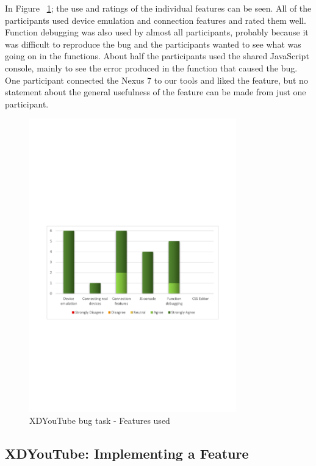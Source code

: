 In Figure ~\ref{fig:xdyt_bug_features_used}; the use and ratings of the individual features can be seen. All of the participants used device emulation and connection features and rated them well. Function debugging was also used by almost all participants, probably because it was difficult to reproduce the bug and the participants wanted to see what was going on in the functions. About half the participants used the shared JavaScript console, mainly to see the error produced in the function that caused the bug. One participant connected the Nexus 7 to our tools and liked the feature, but no statement about the general usefulness of the feature can be made from just one participant. 

\begin{figure}[H]
  \centering
    \includegraphics[width=0.8\textwidth]{images/charts/xdyt_bug_features_used.pdf}
	\caption{XDYouTube bug task - Features used}
	\label{fig:xdyt_bug_features_used}
\end{figure}

\subsection{XDYouTube: Implementing a Feature}

